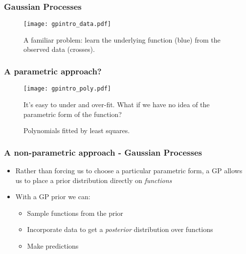 

\begin{frame}
	\frametitle{Gaussian Processes}
	\begin{figure}[tbh]
		\texttt{[image: gpintro\_data.pdf]}		
		\centering\caption{\label{fig:gpintro_data}A familiar problem: learn the underlying function (blue) from the observed data (crosses).}
	\end{figure}
\end{frame}

\begin{frame}
	\frametitle{A parametric approach?}
	\begin{figure}[tbh]
		\texttt{[image: gpintro\_poly.pdf]}		
		\centering\caption{\label{fig:gpintro_poly}Polynomials fitted by least squares.}
		It's easy to under and over-fit. What if we have no idea of the parametric form of the function?
	\end{figure}
\end{frame}

\begin{frame}
	\frametitle{A non-parametric approach - Gaussian Processes}
	\begin{itemize}
		\item Rather than forcing us to choose a particular parametric form, a \ac{GP} allows us to place a prior distribution directly on \emph{functions}
		\item With a \ac{GP} prior we can:
		\begin{itemize}
			\item Sample functions from the prior
			\item Incorporate data to get a \emph{posterior} distribution over functions
			\item Make predictions
		\end{itemize}
	\end{itemize}
\end{frame}


